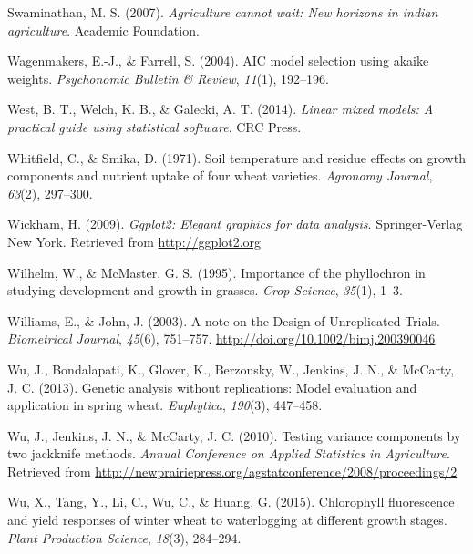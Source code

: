 \documentclass[12pt,oneside]{dukestatscithesis} %
\newlength{\cslhangindent}
\newenvironment{cslreferences}%
  {\setlength{\parindent}{0pt}%
  \everypar{\setlength{\hangindent}{\cslhangindent}}\ignorespaces}%
  {\par}
\begin{document}
\begin{cslreferences}
\leavevmode\hypertarget{ref-swaminathan2007agriculture}{}%
Swaminathan, M. S. (2007). \emph{Agriculture cannot wait: New horizons in indian agriculture}. Academic Foundation.

\leavevmode\hypertarget{ref-wagenmakers2004aic}{}%
Wagenmakers, E.-J., \& Farrell, S. (2004). AIC model selection using akaike weights. \emph{Psychonomic Bulletin \& Review}, \emph{11}(1), 192--196.

\leavevmode\hypertarget{ref-west2014linear}{}%
West, B. T., Welch, K. B., \& Galecki, A. T. (2014). \emph{Linear mixed models: A practical guide using statistical software}. CRC Press.

\leavevmode\hypertarget{ref-whitfield1971soil}{}%
Whitfield, C., \& Smika, D. (1971). Soil temperature and residue effects on growth components and nutrient uptake of four wheat varieties. \emph{Agronomy Journal}, \emph{63}(2), 297--300.

\leavevmode\hypertarget{ref-hadley2009}{}%
Wickham, H. (2009). \emph{Ggplot2: Elegant graphics for data analysis}. Springer-Verlag New York. Retrieved from \url{http://ggplot2.org}

\leavevmode\hypertarget{ref-wilhelm1995importance}{}%
Wilhelm, W., \& McMaster, G. S. (1995). Importance of the phyllochron in studying development and growth in grasses. \emph{Crop Science}, \emph{35}(1), 1--3.

\leavevmode\hypertarget{ref-williams_note_2003}{}%
Williams, E., \& John, J. (2003). A note on the Design of Unreplicated Trials. \emph{Biometrical Journal}, \emph{45}(6), 751--757. \url{http://doi.org/10.1002/bimj.200390046}

\leavevmode\hypertarget{ref-wu2013}{}%
Wu, J., Bondalapati, K., Glover, K., Berzonsky, W., Jenkins, J. N., \& McCarty, J. C. (2013). Genetic analysis without replications: Model evaluation and application in spring wheat. \emph{Euphytica}, \emph{190}(3), 447--458.

\leavevmode\hypertarget{ref-wu2010}{}%
Wu, J., Jenkins, J. N., \& McCarty, J. C. (2010). Testing variance components by two jackknife methods. \emph{Annual Conference on Applied Statistics in Agriculture}. Retrieved from \url{http://newprairiepress.org/agstatconference/2008/proceedings/2}

\leavevmode\hypertarget{ref-wu2015chlorophyll}{}%
Wu, X., Tang, Y., Li, C., Wu, C., \& Huang, G. (2015). Chlorophyll fluorescence and yield responses of winter wheat to waterlogging at different growth stages. \emph{Plant Production Science}, \emph{18}(3), 284--294.


\end{cslreferences}
\end{document}
